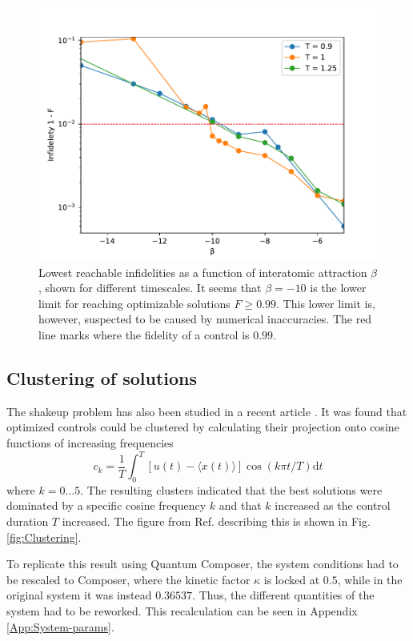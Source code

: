 \documentclass[a4paper, twocolumn]{revtex4-1}
\begin{document}
\begin{figure}
	\includegraphics[width=\columnwidth]{graphics/exploration/reachable_neg_beta.pdf}
	\caption{Lowest reachable infidelities as a function of interatomic attraction $\beta$, shown for different timescales. It seems that $\beta=-10$ is the lower limit for reaching optimizable solutions $F\geq0.99$. This lower limit is, however, suspected to be caused by numerical inaccuracies. The red line marks where the fidelity of a control is $0.99$.}
	\label{fig:reachable_neg_betas}
\end{figure}

\subsection{Clustering of solutions}\label{subsec:composer-clustering}
The shakeup problem has also been studied in a recent article \cite{QM2Paper}. It was found that optimized controls could be clustered by calculating their projection onto cosine functions of increasing frequencies
\begin{equation}
	c_k = \frac{1}{T} \int_{0}^{T} [u(t) - \langle x(t)\rangle]\cos(k \pi t/T) \text{d}t
	\label{eq:QM2-ck-expression}
\end{equation}
where $k=0\dots5$. The resulting clusters indicated that the best solutions were dominated by a specific cosine frequency $k$ and that $k$ increased as the control duration $T$ increased. The figure from Ref.  \cite{QM2Paper} describing this is shown in Fig. \ref{fig:Clustering}.

To replicate this result using Quantum Composer, the system conditions had to be rescaled to Composer, where the kinetic factor $\kappa$ is locked at $0.5$, while in the original system it was instead $0.36537$. Thus, the different quantities of the system had to be reworked. This recalculation can be seen in Appendix \ref{App:System-params}.\\
\end{document}
